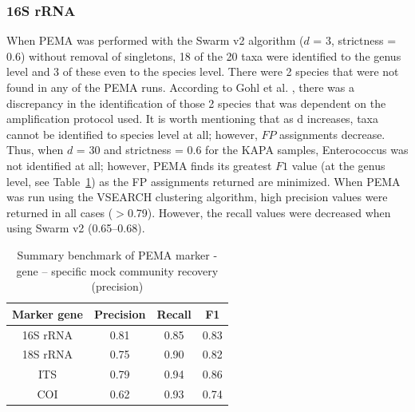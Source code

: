    \subsubsection*{16S rRNA}

      When PEMA was performed with the Swarm v2 algorithm ($d$ = 3, strictness = 0.6) without removal of singletons, 18 of the 20 taxa were identified to the genus level and 3 of these even to the species level. 
      There were 2 species that were not found in any of the PEMA runs. 
      According to Gohl et al. \cite{gohl2016systematic}, there was a discrepancy in the identification of those 2 species that was dependent on the amplification protocol used. 
      It is worth mentioning that as d increases, taxa cannot be identified to species level at all; 
      however, $FP$ assignments decrease. 
      Thus, when $d$ = 30 and strictness = 0.6 for the KAPA samples, Enterococcus was not identified at all; 
      however, PEMA finds its greatest $F1$ value (at the genus level, see Table~\ref{table:pema-precision}) as the FP assignments returned are minimized. 
      When PEMA was run using the VSEARCH clustering algorithm, high precision values were returned in all cases ($>$0.79). 
      However, the recall values were decreased when using Swarm v2 (0.65–0.68).

      \begin{table}
         \begin{center}
            \begin{tabular}{@{}cccc@{}}
               \toprule
               \multicolumn{1}{c}{\textbf{Marker gene}} & \multicolumn{1}{c}{\textbf{Precision}} & \multicolumn{1}{c}{\textbf{Recall}} & \multicolumn{1}{c}{\textbf{F1}} \\ \midrule
               16S rRNA & 0.81 & 0.85 & 0.83 \\
               18S rRNA & 0.75 & 0.90 & 0.82 \\
               ITS & 0.79 & 0.94 & 0.86 \\
               COI & 0.62 & 0.93 & 0.74
               \end{tabular}
               \caption[Summary benchmark of PEMA marker - gene - specific mock community recovery]{Summary benchmark of PEMA marker - gene – specific mock community recovery (precision)}
               \label{table:pema-precision}
         \end{center}
      \end{table}




